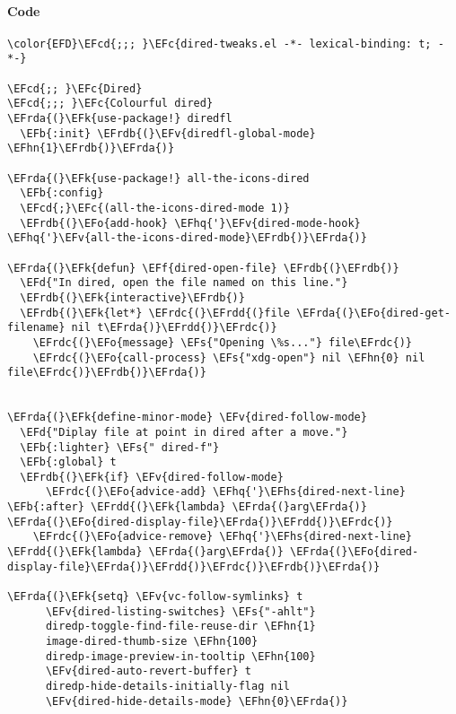 \documentclass[a4wide,10pt]{article}
\newcommand{\EFc}[1]{\textcolor{EFc}{#1}} %
\newcommand{\EFcd}[1]{\textcolor{EFcd}{#1}} %
\newcommand{\EFs}[1]{\textcolor{EFs}{#1}} %
\newcommand{\EFd}[1]{\textcolor{EFd}{#1}} %
\newcommand{\EFk}[1]{\textcolor{EFk}{#1}} %
\newcommand{\EFb}[1]{\textcolor{EFb}{#1}} %
\newcommand{\EFf}[1]{\textcolor{EFf}{#1}} %
\newcommand{\EFv}[1]{\textcolor{EFv}{#1}} %
\newcommand{\EFo}[1]{\textcolor{EFo}{#1}} %
\newcommand{\EFhn}[1]{\textcolor{EFhn}{\textbf{#1}}} %
\newcommand{\EFhq}[1]{\textcolor{EFhq}{#1}} %
\newcommand{\EFhs}[1]{\textcolor{EFhs}{#1}} %
\newcommand{\EFrda}[1]{\textcolor{EFrda}{#1}} %
\newcommand{\EFrdb}[1]{\textcolor{EFrdb}{#1}} %
\newcommand{\EFrdc}[1]{\textcolor{EFrdc}{#1}} %
\newcommand{\EFrdd}[1]{\textcolor{EFrdd}{#1}} %
\begin{document}
\paragraph{Code}
\label{sec:org71e8d94}
\begin{Code}
\begin{Verbatim}
\color{EFD}\EFcd{;;; }\EFc{dired-tweaks.el -*- lexical-binding: t; -*-}

\EFcd{;; }\EFc{Dired}
\EFcd{;;; }\EFc{Colourful dired}
\EFrda{(}\EFk{use-package!} diredfl
  \EFb{:init} \EFrdb{(}\EFv{diredfl-global-mode} \EFhn{1}\EFrdb{)}\EFrda{)}

\EFrda{(}\EFk{use-package!} all-the-icons-dired
  \EFb{:config}
  \EFcd{;}\EFc{(all-the-icons-dired-mode 1)}
  \EFrdb{(}\EFo{add-hook} \EFhq{'}\EFv{dired-mode-hook} \EFhq{'}\EFv{all-the-icons-dired-mode}\EFrdb{)}\EFrda{)}

\EFrda{(}\EFk{defun} \EFf{dired-open-file} \EFrdb{(}\EFrdb{)}
  \EFd{"In dired, open the file named on this line."}
  \EFrdb{(}\EFk{interactive}\EFrdb{)}
  \EFrdb{(}\EFk{let*} \EFrdc{(}\EFrdd{(}file \EFrda{(}\EFo{dired-get-filename} nil t\EFrda{)}\EFrdd{)}\EFrdc{)}
    \EFrdc{(}\EFo{message} \EFs{"Opening \%s..."} file\EFrdc{)}
    \EFrdc{(}\EFo{call-process} \EFs{"xdg-open"} nil \EFhn{0} nil file\EFrdc{)}\EFrdb{)}\EFrda{)}


\EFrda{(}\EFk{define-minor-mode} \EFv{dired-follow-mode}
  \EFd{"Diplay file at point in dired after a move."}
  \EFb{:lighter} \EFs{" dired-f"}
  \EFb{:global} t
  \EFrdb{(}\EFk{if} \EFv{dired-follow-mode}
      \EFrdc{(}\EFo{advice-add} \EFhq{'}\EFhs{dired-next-line} \EFb{:after} \EFrdd{(}\EFk{lambda} \EFrda{(}arg\EFrda{)} \EFrda{(}\EFo{dired-display-file}\EFrda{)}\EFrdd{)}\EFrdc{)}
    \EFrdc{(}\EFo{advice-remove} \EFhq{'}\EFhs{dired-next-line} \EFrdd{(}\EFk{lambda} \EFrda{(}arg\EFrda{)} \EFrda{(}\EFo{dired-display-file}\EFrda{)}\EFrdd{)}\EFrdc{)}\EFrdb{)}\EFrda{)}

\EFrda{(}\EFk{setq} \EFv{vc-follow-symlinks} t
      \EFv{dired-listing-switches} \EFs{"-ahlt"}
      diredp-toggle-find-file-reuse-dir \EFhn{1}
      image-dired-thumb-size \EFhn{100}
      diredp-image-preview-in-tooltip \EFhn{100}
      \EFv{dired-auto-revert-buffer} t
      diredp-hide-details-initially-flag nil
      \EFv{dired-hide-details-mode} \EFhn{0}\EFrda{)}


\end{Verbatim}
\end{Code}
\end{document}
